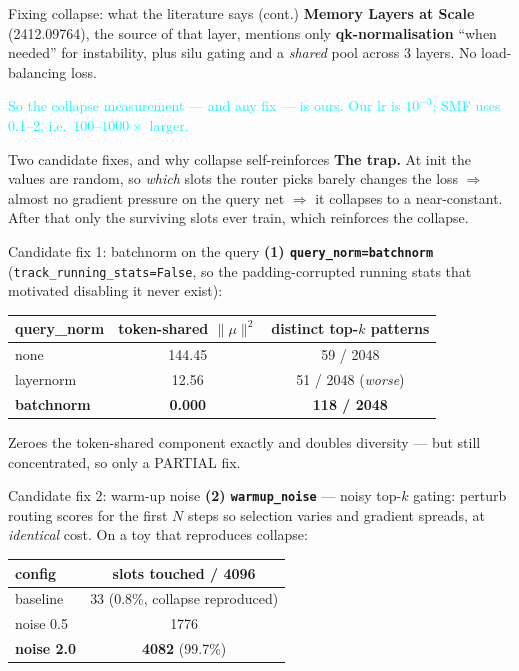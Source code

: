 \documentclass{beamer}
\newcommand{\pierre}[1]{\textcolor{cyan}{#1}}
\begin{document}
\begin{frame}{Fixing collapse: what the literature says (cont.)}
\textbf{Memory Layers at Scale} (2412.09764), the source of that layer, mentions
only \textbf{qk-normalisation} ``when needed'' for instability, plus silu gating
and a \emph{shared} pool across 3 layers. No load-balancing loss.

\medskip
\pierre{So the collapse measurement --- and any fix --- is ours. Our lr is
$10^{-3}$; SMF uses 0.1--2, i.e.\ $100\text{--}1000\times$ larger.}
\end{frame}

\begin{frame}{Two candidate fixes, and why collapse self-reinforces}
\textbf{The trap.} At init the values are random, so \emph{which} slots the router
picks barely changes the loss $\Rightarrow$ almost no gradient pressure on the
query net $\Rightarrow$ it collapses to a near-constant. After that only the
surviving slots ever train, which reinforces the collapse.

\end{frame}

\begin{frame}{Candidate fix 1: batchnorm on the query}
\textbf{(1) \texttt{query\_norm=batchnorm}} (\texttt{track\_running\_stats=False},
so the padding-corrupted running stats that motivated disabling it never exist):
\begin{center}
\begin{tabular}{|l|c|c|}
\hline
query\_norm & token-shared $\|\mu\|^2$ & distinct top-$k$ patterns \\
\hline
none      & 144.45 & 59 / 2048 \\
layernorm & 12.56  & 51 / 2048 \quad(\emph{worse}) \\
\textbf{batchnorm} & \textbf{0.000} & \textbf{118 / 2048} \\
\hline
\end{tabular}
\end{center}
Zeroes the token-shared component exactly and doubles diversity ---
\alert{but still concentrated, so only a PARTIAL fix.}

\end{frame}

\begin{frame}{Candidate fix 2: warm-up noise}
\textbf{(2) \texttt{warmup\_noise}} --- noisy top-$k$ gating: perturb routing
scores for the first $N$ steps so selection varies and gradient spreads, at
\emph{identical} cost. On a toy that reproduces collapse:
\begin{center}
\begin{tabular}{|l|c|}
\hline
config & slots touched / 4096 \\
\hline
baseline  & \alert{33} \quad(0.8\%, collapse reproduced) \\
noise 0.5 & 1776 \\
\textbf{noise 2.0} & \textbf{4082} \quad(99.7\%) \\
\hline
\end{tabular}
\end{center}
\end{frame}
\end{document}
